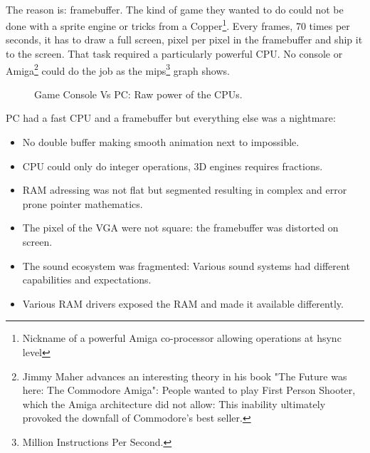\\
The reason is: framebuffer. The kind of game they wanted to do could not be done with a sprite engine or tricks from a Copper\footnote{Nickname of a powerful Amiga co-processor allowing operations at hsync level}. Every frames, 70 times per seconds, it has to draw a full screen, pixel per pixel in the framebuffer and ship it to the screen. That task required a particularly powerful CPU. No console or Amiga\footnote{Jimmy Maher advances an interesting theory in his book "The Future was here: The Commodore Amiga": People wanted to play First Person Shooter, which the Amiga architecture did not allow: This inability ultimately provoked the downfall of Commodore's best seller.} could do the job as the mips\footnote{Million Instructions Per Second.} graph shows.
\par
\begin{figure}[H]
\centering
   \caption{Game Console Vs PC: Raw power of the CPUs.} \label{fig:game_console_vs_PC}
 \end{figure}
 
PC had a fast CPU and a framebuffer but everything else was a nightmare:
\begin{itemize}
\item No double buffer making smooth animation next to impossible.
\item CPU could only do integer operations, 3D engines requires fractions.
\item RAM adressing was not flat but segmented resulting in complex and error prone pointer mathematics.
\item The pixel of the VGA were not square: the framebuffer was distorted on screen.
\item The sound ecosystem was fragmented: Various sound systems had different capabilities and expectations.
\item Various RAM drivers exposed the RAM and made it available differently.
\end{itemize}

